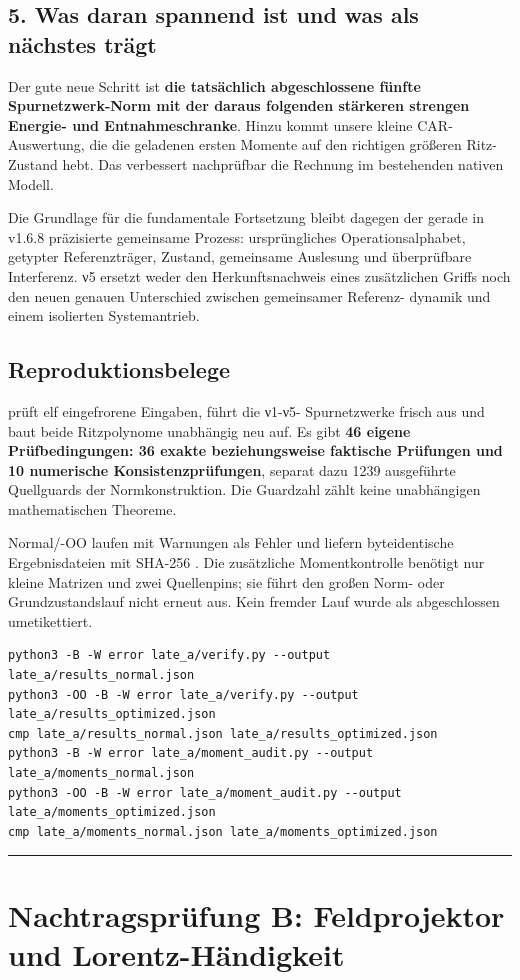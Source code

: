\subsection{5. Was daran spannend ist und was als nächstes
trägt}\label{was-daran-spannend-ist-und-was-als-nuxe4chstes-truxe4gt}

Der gute neue Schritt ist \textbf{die tatsächlich abgeschlossene fünfte
Spurnetzwerk-Norm mit der daraus folgenden stärkeren strengen Energie-
und Entnahmeschranke}. Hinzu kommt unsere kleine CAR-Auswertung, die die
geladenen ersten Momente auf den richtigen größeren Ritz-Zustand hebt.
Das verbessert nachprüfbar die Rechnung im bestehenden nativen Modell.

Die Grundlage für die fundamentale Fortsetzung bleibt dagegen der gerade
in v1.6.8 präzisierte gemeinsame Prozess: ursprüngliches
Operationsalphabet, getypter Referenzträger, Zustand, gemeinsame
Auslesung und überprüfbare Interferenz. ν5 ersetzt weder den
Herkunftsnachweis eines zusätzlichen Griffs noch den neuen genauen
Unterschied zwischen gemeinsamer Referenz- dynamik und einem isolierten
Systemantrieb.

\subsection{Reproduktionsbelege}\label{reproduktionsbelege}

 prüft elf eingefrorene Eingaben, führt die
ν1-ν5- Spurnetzwerke frisch aus und baut beide Ritzpolynome unabhängig
neu auf. Es gibt \textbf{46 eigene Prüfbedingungen: 36 exakte
beziehungsweise faktische Prüfungen und 10 numerische
Konsistenzprüfungen}, separat dazu 1239 ausgeführte Quellguards der
Normkonstruktion. Die Guardzahl zählt keine unabhängigen mathematischen
Theoreme.

Normal/-OO laufen mit Warnungen als Fehler und liefern byteidentische
Ergebnisdateien mit SHA-256
.
Die zusätzliche Momentkontrolle benötigt nur kleine Matrizen und zwei
Quellenpins; sie führt den großen Norm- oder Grundzustandslauf nicht
erneut aus. Kein fremder Lauf wurde als abgeschlossen umetikettiert.

\begin{verbatim}
python3 -B -W error late_a/verify.py --output late_a/results_normal.json
python3 -OO -B -W error late_a/verify.py --output late_a/results_optimized.json
cmp late_a/results_normal.json late_a/results_optimized.json
python3 -B -W error late_a/moment_audit.py --output late_a/moments_normal.json
python3 -OO -B -W error late_a/moment_audit.py --output late_a/moments_optimized.json
cmp late_a/moments_normal.json late_a/moments_optimized.json
\end{verbatim}

\begin{center}\rule{0.5\linewidth}{0.5pt}\end{center}

\section{Nachtragsprüfung B: Feldprojektor und
Lorentz-Händigkeit}\label{nachtragspruxfcfung-b-feldprojektor-und-lorentz-huxe4ndigkeit}

